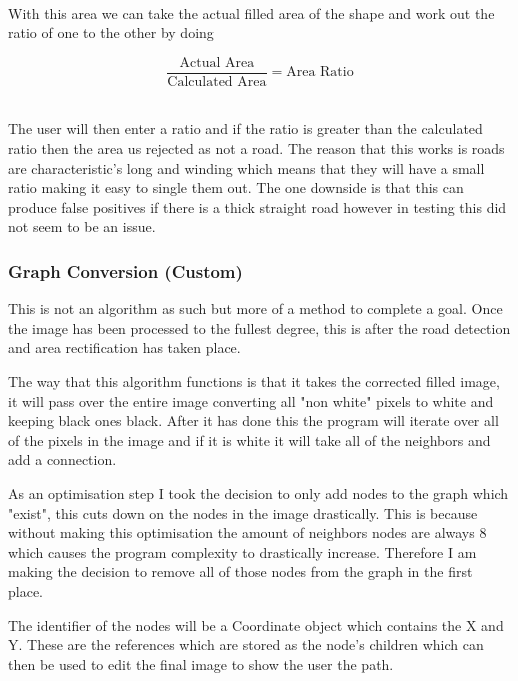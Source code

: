 \begin{FlushLeft}
    \\ \bk

    With this area we can take the actual filled area of the shape and work out the ratio of one to the other by doing

    $$
        \frac{\text{Actual Area}}{\text{Calculated Area}} = \text{Area Ratio}
    $$
    \\ \bk

    The user will then enter a ratio and if the ratio is greater than the calculated ratio then the area us rejected as not a road. The reason that this works is roads are characteristic's long and winding which means that they will have a small ratio making it easy to single them out. The one downside is that this can produce false positives if there is a thick straight road however in testing this did not seem to be an issue. \\


    \bk

    \subsubsection{Graph Conversion (Custom)}
    This is not an algorithm as such but more of a method to complete a goal. Once the image has been processed to the fullest degree, this is after the road detection and area rectification has taken place.  \\ \bk

    The way that this algorithm functions is that it takes the corrected filled image, it will pass over the entire image converting all "non white" pixels to white and keeping black ones black. After it has done this the program will iterate over all of the pixels in the image and if it is white it will take all of the neighbors and add a connection. \\ \bk

    As an optimisation step I took the decision to only add nodes to the graph which "exist", this cuts down on the nodes in the image drastically. This is because without making this optimisation the amount of neighbors nodes are always 8 which causes the program complexity to drastically increase. Therefore I am making the decision to remove all of those nodes from the graph in the first place. \\ \bk

    The identifier of the nodes will be a Coordinate object which contains the X and Y. These are the references which are stored as the node's children which can then be used to edit the final image to show the user the path.
    \bk


\end{FlushLeft}

